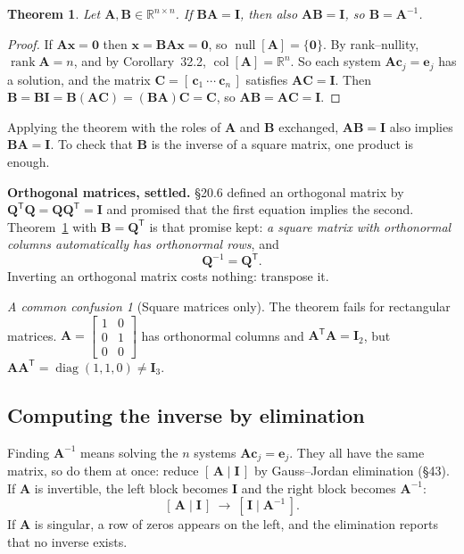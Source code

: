 \documentclass[11pt]{article}
\theoremstyle{plain}
\newtheorem{thm}{Theorem}[section]
\theoremstyle{definition}
\theoremstyle{remark}
\newtheorem*{warn}{A common confusion}
\newcommand{\R}{\mathbb{R}}
\newcommand{\vc}[1]{\mathbf{#1}}
\newcommand{\mt}[1]{\mathbf{#1}}
\newcommand{\T}{^{\mathsf{T}}}
\newcommand{\colsp}[1]{\operatorname{col}[#1]}
\newcommand{\nullsp}[1]{\operatorname{null}[#1]}
\DeclareMathOperator{\diagop}{diag}
\DeclareMathOperator{\rank}{rank}
\begin{document}
\begin{thm}
\label{thm:onesided}
Let $\mt{A},\mt{B}\in\R^{n\times n}$. If $\mt{B}\mt{A}=\mt{I}$, then also
$\mt{A}\mt{B}=\mt{I}$, so $\mt{B}=\mt{A}^{-1}$.
\end{thm}

\begin{proof}
If $\mt{A}\vc{x}=\vc{0}$ then $\vc{x}=\mt{B}\mt{A}\vc{x}=\vc{0}$, so
$\nullsp{\mt{A}}=\{\vc{0}\}$. By rank--nullity, $\rank\mt{A}=n$, and by
Corollary~32.2, $\colsp{\mt{A}}=\R^{n}$. So each system $\mt{A}\vc{c}_j=\vc{e}_j$
has a solution, and the matrix $\mt{C}=[\,\vc{c}_1\ \cdots\ \vc{c}_n\,]$
satisfies $\mt{A}\mt{C}=\mt{I}$. Then
$\mt{B}=\mt{B}\mt{I}=\mt{B}(\mt{A}\mt{C})=(\mt{B}\mt{A})\mt{C}=\mt{C}$, so
$\mt{A}\mt{B}=\mt{A}\mt{C}=\mt{I}$.
\end{proof}

\noindent Applying the theorem with the roles of $\mt{A}$ and $\mt{B}$ exchanged,
$\mt{A}\mt{B}=\mt{I}$ also implies $\mt{B}\mt{A}=\mt{I}$. To check that $\mt{B}$
is the inverse of a square matrix, one product is enough.

\textbf{Orthogonal matrices, settled.} \S20.6 defined an orthogonal matrix by
$\mt{Q}\T\mt{Q}=\mt{Q}\mt{Q}\T=\mt{I}$ and promised that the first equation
implies the second. Theorem~\ref{thm:onesided} with $\mt{B}=\mt{Q}\T$ is that
promise kept: \emph{a square matrix with orthonormal columns automatically has
orthonormal rows}, and
\[
  \mt{Q}^{-1}=\mt{Q}\T .
\]
Inverting an orthogonal matrix costs nothing: transpose it.

\begin{warn}[Square matrices only]
The theorem fails for rectangular matrices. $\mt{A}=\begin{bmatrix}1&0\\0&1\\0&0\end{bmatrix}$
has orthonormal columns and $\mt{A}\T\mt{A}=\mt{I}_2$, but
$\mt{A}\mt{A}\T=\diagop(1,1,0)\neq\mt{I}_3$.
\end{warn}

\subsection{Computing the inverse by elimination}
Finding $\mt{A}^{-1}$ means solving the $n$ systems $\mt{A}\vc{c}_j=\vc{e}_j$.
They all have the same matrix, so do them at once: reduce $[\,\mt{A}\mid\mt{I}\,]$
by Gauss--Jordan elimination (\S43). If $\mt{A}$ is invertible, the left block
becomes $\mt{I}$ and the right block becomes $\mt{A}^{-1}$:
\[
  [\,\mt{A}\mid\mt{I}\,]\ \longrightarrow\ [\,\mt{I}\mid\mt{A}^{-1}\,].
\]
If $\mt{A}$ is singular, a row of zeros appears on the left, and the elimination
reports that no inverse exists.
\end{document}
